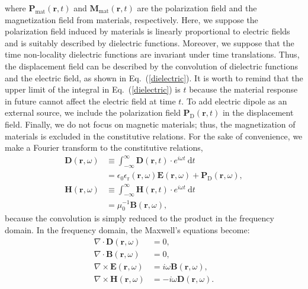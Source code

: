 \documentclass[journal=jacsat,manuscript=article,layout=traditional]{achemso}
\newcommand*\diff{\mathrm{d}}
\begin{document}
where $\mathbf{P}_\textrm{mat}(\mathbf{r},t)$ and $\mathbf{M}_\textrm{mat}(\mathbf{r},t)$ are the polarization field and the magnetization field from materials, respectively.
Here, we suppose the polarization field induced by materials is linearly proportional to electric fields and is suitably described by dielectric functions.
Moreover, we suppose that the time non-locality dielectric functions are invariant under time translations.
Thus, the displacement field can be described by the convolution of dielectric functions and the electric field, as shown in Eq.~(\ref{dielectric}).
It is worth to remind that the upper limit of the integral in Eq.~(\ref{dielectric}) is $t$ because the material response in future cannot affect the electric field at time $t$.
To add electric dipole as an external source, we include the polarization field $\mathbf{P}_\textrm{D}(\mathbf{r},t)$ in the displacement field.
Finally, we do not focus on magnetic materials; thus, the magnetization of materials is excluded in the constitutive relations.
For the sake of convenience, we make a Fourier transform to the constitutive relations,
\begin{subequations}
    \begin{align}
        \nonumber
        \mathbf{D}(\mathbf{r},\omega) &\equiv \int_{-\infty}^\infty{\mathbf{D}(\mathbf{r},t)\cdot e^{i\omega t}~\diff t}\\
        &= \epsilon_0 \epsilon_\mathrm{r}(\mathbf{r},\omega)\mathbf{E}(\mathbf{r},\omega) + 
        \mathbf{P}_\textrm{D}(\mathbf{r},\omega),\\
        \nonumber
        \mathbf{H}(\mathbf{r},\omega) &\equiv \int_{-\infty}^\infty{\mathbf{H}(\mathbf{r},t)\cdot e^{i\omega t}~\diff t}\\
        &= \mu_0^{-1}\mathbf{B}(\mathbf{r},\omega),
    \end{align}
\end{subequations}
because the convolution is simply reduced to the product in the frequency domain.
In the frequency domain, the Maxwell's equations become:
\begin{subequations}
\begin{align}
    \nabla\cdot \mathbf{D}(\mathbf{r},\omega) &= 0, \\
    \nabla\cdot \mathbf{B}(\mathbf{r},\omega) &= 0, \\
    \label{EB}
    \nabla\times \mathbf{E}(\mathbf{r},\omega) &= i\omega \mathbf{B}(\mathbf{r},\omega), \\
    \nabla\times \mathbf{H}(\mathbf{r},\omega) &= -i\omega \mathbf{D}(\mathbf{r},\omega). 
\end{align}
\end{subequations}
\end{document}

